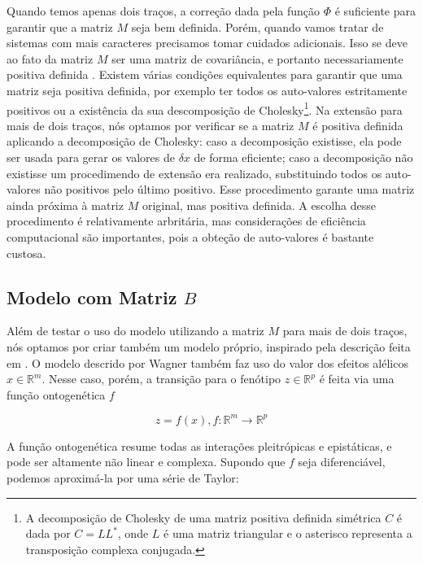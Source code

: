Quando temos apenas dois traços, a correção dada pela função $\Phi$ é
suficiente para garantir que a matriz $M$ seja bem definida.
Porém, quando vamos tratar de sistemas com mais caracteres precisamos
tomar cuidados adicionais.
Isso se deve ao fato da matriz $M$ ser uma matriz de covariância, e
portanto necessariamente positiva definida \citep{Anderson1984}.
Existem várias condições equivalentes para garantir que uma matriz seja
positiva definida, por exemplo ter todos os auto-valores estritamente
positivos ou a existência da sua descomposição de Cholesky\footnote{A
   decomposição de Cholesky de uma matriz positiva definida simétrica
$C$ é dada por $C=LL^*$, onde $L$ é uma matriz triangular e o asterisco
representa a transposição complexa conjugada.}.
Na extensão para mais de dois traços, nós optamos por verificar se a
matriz $M$ é positiva definida aplicando a decomposição de Cholesky:
caso a decomposição existisse, ela pode ser usada para gerar os valores
de $\delta x$ de forma eficiente; caso a decomposição não existisse um
procedimendo de extensão \citep{Marroig2011b} era realizado,
substituindo todos os auto-valores não positivos pelo último positivo.
Esse procedimento garante uma matriz ainda próxima à matriz $M$
original, mas positiva definida.
A escolha desse procedimento é relativamente arbritária, mas
considerações de eficiência computacional são importantes, pois a
obteção de auto-valores é bastante custosa.

\subsection{Modelo com Matriz $B$}\label{cap2:mem:ModelB}

Além de testar o uso do modelo utilizando a matriz $M$ para mais de dois
traços, nós optamos por criar também um modelo próprio, inspirado pela
descrição feita em \cite{Wagner1984}.
O modelo descrido por Wagner também faz uso do valor dos efeitos
alélicos $x \in \mathbb{R}^m$.
Nesse caso, porém, a transição para o fenótipo $z \in \mathbb{R}^p$ é
feita via uma função ontogenética $f$

\begin{equation}
z = f(x), f:\mathbb{R}^m \rightarrow \mathbb{R}^{p}
\end{equation}

A função ontogenética resume todas as interações pleitrópicas e
epistáticas, e pode ser altamente não linear e complexa.
Supondo que $f$ seja diferenciável, podemos aproximá-la por uma série de
Taylor:

